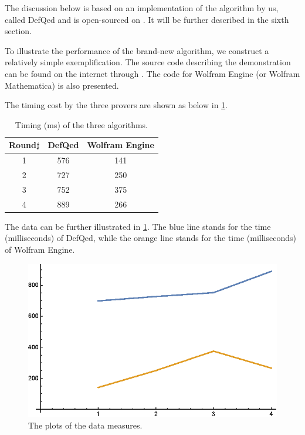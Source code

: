 \documentclass{aims}
\numberwithin{equation}{section}
\numberwithin{theorem}{section}	%
\numberwithin{axiom}{section}	%
\numberwithin{definition}{section}	%
\begin{document}
	The discussion below is based on an implementation of the algorithm by us, called DefQed and is open-sourced on \cite{Wang2022}. It will be further described in the sixth section.
	
	To illustrate the performance of the brand-new algorithm, we construct a relatively simple exemplification. The source code describing the demonstration can be found on the internet through \cite{Wang2022-2}. The code for Wolfram Engine (or Wolfram Mathematica) is also presented.
	
	The timing cost by the three provers are shown as below in \ref{table-2}.
	
	\begin{table}[h]
		\centering
		\caption{Timing (ms) of the three algorithms.}
		\begin{tabular}{ccc}
			\toprule
			Round$\sharp$ & DefQed & Wolfram Engine \\
			\midrule
			1 & 576 & 141  \\ 
			2 & 727 & 250  \\ 
			3 & 752 & 375  \\ 
			4 & 889 & 266  \\ 
			\bottomrule
		\end{tabular}
		\label{table-2}
	\end{table}
	
	The data can be further illustrated in \ref{figure-4}. The blue line stands for the time (milliseconds) of DefQed, while the orange line stands for the time (milliseconds) of Wolfram Engine.
	
	\begin{figure}[h]
		\centering
		\includegraphics{plot.eps}
		\caption{The plots of the data measures.}
		\label{figure-4}
	\end{figure}
\end{document}
